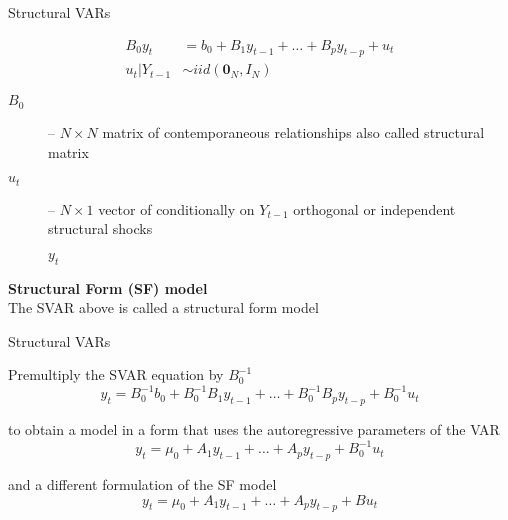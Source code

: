 \documentclass[notes,blackandwhite,mathsans,usenames,dvipsnames]{beamer}
\begin{document}
\begin{frame}{Structural VARs}

\begin{align*}
B_0y_t &= b_0 + B_1y_{t-1}+ \dots + B_py_{t-p} + u_t\\
u_t|Y_{t-1} &\sim iid(\mathbf{0}_N,I_N)
\end{align*}

\bigskip\begin{description}
\item[$B_0$] {\color{mcxs2}--} $N\times N$ {\color{mcxs2}matrix of} {\color{purple}contemporaneous relationships} {\color{mcxs2}also called} {\color{purple}structural matrix}\\


\item[$u_t$] {\color{mcxs2}--} $N\times1$ {\color{mcxs2}vector of conditionally on} $Y_{t-1}$ {\color{mcxs2}orthogonal or independent} {\color{purple}structural shocks}

 $y_t$
\end{description}

\bigskip\textbf{Structural Form (SF) model}\\
{\color{mcxs2}The SVAR above is called a} {\color{purple}structural form} {\color{mcxs2}model} 

\end{frame}




\begin{frame}{Structural VARs}

{\color{mcxs2}Premultiply the SVAR equation by} $B_0^{-1}$
$$ y_t = B_0^{-1}b_0 + B_0^{-1}B_1y_{t-1}+ \dots + B_0^{-1}B_py_{t-p} + B_0^{-1}u_t $$

{\color{mcxs2}to obtain a model in a form that uses the autoregressive parameters of the VAR}
$$ y_t = \mu_0 + A_1y_{t-1}+ \dots + A_py_{t-p} + B_0^{-1}u_t$$

{\color{mcxs2}and a different formulation of the} {\color{purple}SF} {\color{mcxs2}model}
$$ y_t = \mu_0 + A_1y_{t-1}+ \dots + A_py_{t-p} + Bu_t$$

\end{frame}
\end{document}
